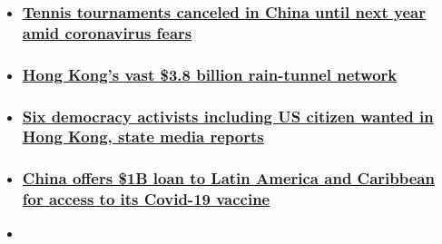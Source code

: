 \begin{itemize}
\item
  \hypertarget{tennis-tournaments-canceled-in-china-until-next-year-amid-coronavirus-fears-}{%
  \subsubsection{\texorpdfstring{\href{/2020/07/24/tennis/atp-wta-china-pandemic-coronavirus-spt-intl/index.html}{Tennis
  tournaments canceled in China until next year amid coronavirus fears
  }}{Tennis tournaments canceled in China until next year amid coronavirus fears }}\label{tennis-tournaments-canceled-in-china-until-next-year-amid-coronavirus-fears-}}
\item
  \hypertarget{hong-kongs-vast-38-billion-rain-tunnel-network}{%
  \subsubsection{\texorpdfstring{\href{/style/article/hong-kong-tunnels-climate-crisis-intl-hnk-dst/index.html}{Hong
  Kong's vast \$3.8 billion rain-tunnel
  network}}{Hong Kong's vast \$3.8 billion rain-tunnel network}}\label{hong-kongs-vast-38-billion-rain-tunnel-network}}
\item
  \hypertarget{six-democracy-activists-including-us-citizen-wanted-in-hong-kong-state-media-reports}{%
  \subsubsection{\texorpdfstring{\href{/2020/08/01/china/hong-kong-activists-arrest-warrant-intl-hnk/index.html}{Six
  democracy activists including US citizen wanted in Hong Kong, state
  media
  reports}}{Six democracy activists including US citizen wanted in Hong Kong, state media reports}}\label{six-democracy-activists-including-us-citizen-wanted-in-hong-kong-state-media-reports}}
\item
  \hypertarget{china-offers-1b-loan-to-latin-america-and-caribbean-for-access-to-its-covid-19-vaccine-}{%
  \subsubsection{\texorpdfstring{\href{/2020/07/23/americas/china-billion-vaccine-latin-america-coronavirus-intl/index.html}{China
  offers \$1B loan to Latin America and Caribbean for access to its
  Covid-19 vaccine
  }}{China offers \$1B loan to Latin America and Caribbean for access to its Covid-19 vaccine }}\label{china-offers-1b-loan-to-latin-america-and-caribbean-for-access-to-its-covid-19-vaccine-}}
\item
  \hypertarget{us-china-ties-reach-an-all-time-low}{%
}
\end{itemize}
